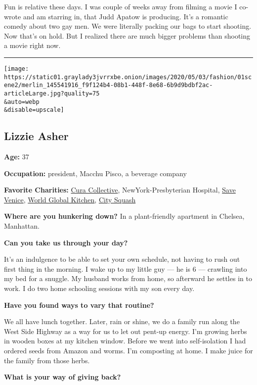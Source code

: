 Fun is relative these days. I was couple of weeks away from filming a
movie I co-wrote and am starring in, that Judd Apatow is producing. It's
a romantic comedy about two gay men. We were literally packing our bags
to start shooting. Now that's on hold. But I realized there are much
bigger problems than shooting a movie right now.

\begin{center}\rule{0.5\linewidth}{\linethickness}\end{center}

\texttt{[image: https://static01.graylady3jvrrxbe.onion/images/2020/05/03/fashion/01scene2/merlin\_145541916\_f9f124b4-08b1-448f-8e68-6b9d9bdbf2ac-articleLarge.jpg?quality=75\\\&auto=webp\\\&disable=upscale]}

\hypertarget{lizzie-asher}{%
\subsection{Lizzie Asher}\label{lizzie-asher}}

\textbf{Age:} 37

\textbf{Occupation:} president, Macchu Pisco, a beverage company

\textbf{Favorite Charities:} \href{https://www.curacollective.org/}{Cura
Collective}, NewYork-Presbyterian Hospital,
\href{https://www.savevenice.org}{Save Venice},
\href{https://wck.org/}{World Global Kitchen},
\href{http://citysquash.org/}{City Squash}

\textbf{Where are you hunkering down?} In a plant-friendly apartment in
Chelsea, Manhattan.

\textbf{Can you take us through your day?}

It's an indulgence to be able to set your own schedule, not having to
rush out first thing in the morning. I wake up to my little guy --- he
is 6 --- crawling into my bed for a snuggle. My husband works from home,
so afterward he settles in to work. I do two home schooling sessions
with my son every day.

\textbf{Have you found ways to vary that routine?}

We all have lunch together. Later, rain or shine, we do a family run
along the West Side Highway as a way for us to let out pent-up energy.
I'm growing herbs in wooden boxes at my kitchen window. Before we went
into self-isolation I had ordered seeds from Amazon and worms. I'm
composting at home. I make juice for the family from those herbs.

\textbf{What is your way of giving back?}

